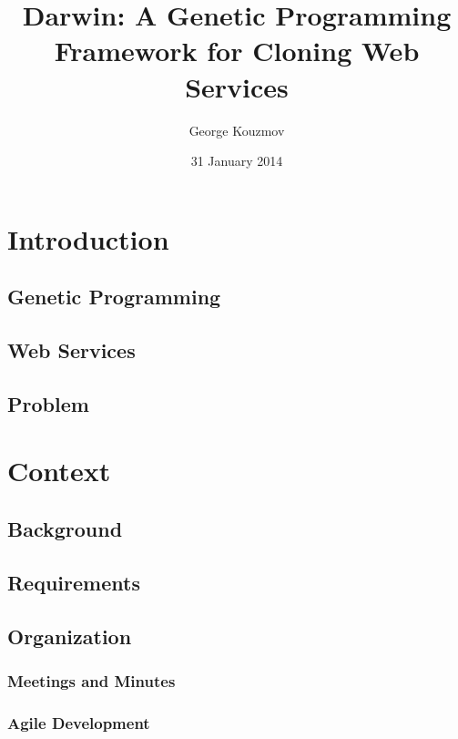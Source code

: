 \documentclass{l4proj}
\begin{document}
\title{Darwin: A Genetic Programming Framework for Cloning Web Services}
\author{George Kouzmov}
\date{31 January 2014}
\maketitle

\tableofcontents
\chapter{Introduction}


\section{Genetic Programming}


\section{Web Services}


\section{Problem}


\chapter{Context}
\section{Background}

\section{Requirements}

\section{Organization}
\subsection{Meetings and Minutes}
\subsection{Agile Development}
\end{document}
